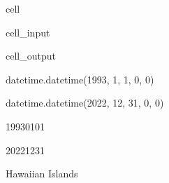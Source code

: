 \documentclass[letterpaper,10pt,english]{jupyterBook}
\begin{document}
\begin{sphinxuseclass}{cell}
\begin{sphinxVerbatimInput}
\begin{sphinxuseclass}{cell_input}
\end{sphinxuseclass}\end{sphinxVerbatimInput}
\begin{sphinxVerbatimOutput}

\begin{sphinxuseclass}{cell_output}
\begin{sphinxVerbatim}[commandchars=\\\{\}]
datetime.datetime(1993, 1, 1, 0, 0)
\end{sphinxVerbatim}

\begin{sphinxVerbatim}[commandchars=\\\{\}]
datetime.datetime(2022, 12, 31, 0, 0)
\end{sphinxVerbatim}

\begin{sphinxVerbatim}[commandchars=\\\{\}]
\PYGZsq{}1993\PYGZhy{}01\PYGZhy{}01\PYGZsq{}
\end{sphinxVerbatim}

\begin{sphinxVerbatim}[commandchars=\\\{\}]
\PYGZsq{}2022\PYGZhy{}12\PYGZhy{}31\PYGZsq{}
\end{sphinxVerbatim}

\begin{sphinxVerbatim}[commandchars=\\\{\}]
\PYGZsq{}Hawaiian Islands\PYGZsq{}
\end{sphinxVerbatim}

\end{sphinxuseclass}\end{sphinxVerbatimOutput}

\end{sphinxuseclass}
\end{document}
